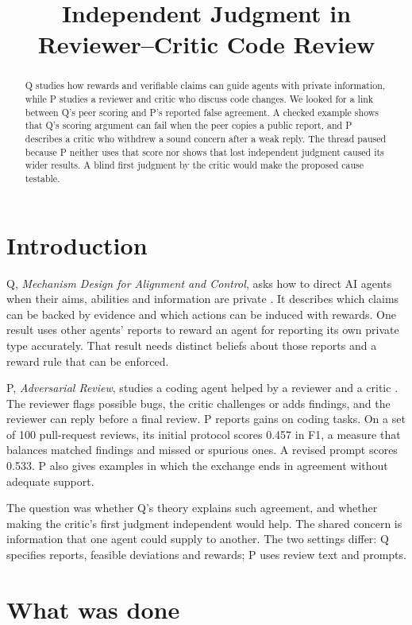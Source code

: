 \documentclass{article}
\title{Independent Judgment in Reviewer--Critic Code Review}
\begin{document}
\maketitle

\begin{abstract}
Q studies how rewards and verifiable claims can guide agents with private information, while P
studies a reviewer and critic who discuss code changes. We looked for a link between Q's peer
scoring and P's reported false agreement. A checked example shows that Q's scoring argument can fail
when the peer copies a public report, and P describes a critic who withdrew a sound concern after a
weak reply. The thread paused because P neither uses that score nor shows that lost independent
judgment caused its wider results. A blind first judgment by the critic would make the proposed
cause testable.
\end{abstract}

\section{Introduction}

Q, \emph{Mechanism Design for Alignment and Control}, asks how to direct AI agents when their aims,
abilities and information are private \cite{Q}. It describes which claims can be backed by evidence
and which actions can be induced with rewards. One result uses other agents' reports to reward an
agent for reporting its own private type accurately. That result needs distinct beliefs about those
reports and a reward rule that can be enforced.

P, \emph{Adversarial Review}, studies a coding agent helped by a reviewer and a critic \cite{P}. The
reviewer flags possible bugs, the critic challenges or adds findings, and the reviewer can reply
before a final review. P reports gains on coding tasks. On a set of 100 pull-request reviews, its
initial protocol scores 0.457 in F1, a measure that balances matched findings and missed or spurious
ones. A revised prompt scores 0.533. P also gives examples in which the exchange ends in agreement
without adequate support.

The question was whether Q's theory explains such agreement, and whether making the critic's first
judgment independent would help. The shared concern is information that one agent could supply to
another. The two settings differ: Q specifies reports, feasible deviations and rewards; P uses
review text and prompts.

\section{What was done}
\end{document}
